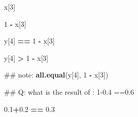 \documentclass[]{book}
\newenvironment{Shaded}{\begin{snugshade}}{\end{snugshade}}
\newcommand{\KeywordTok}[1]{\textcolor[rgb]{0.13,0.29,0.53}{\textbf{#1}}}
\newcommand{\DecValTok}[1]{\textcolor[rgb]{0.00,0.00,0.81}{#1}}
\newcommand{\FloatTok}[1]{\textcolor[rgb]{0.00,0.00,0.81}{#1}}
\newcommand{\StringTok}[1]{\textcolor[rgb]{0.31,0.60,0.02}{#1}}
\newcommand{\OperatorTok}[1]{\textcolor[rgb]{0.81,0.36,0.00}{\textbf{#1}}}
\newcommand{\NormalTok}[1]{#1}
\theoremstyle{definition}
\theoremstyle{definition}
\theoremstyle{definition}
\theoremstyle{remark}
\begin{document}
\begin{Shaded}
\begin{Highlighting}[]
\NormalTok{x[}\DecValTok{3}\NormalTok{]}
\end{Highlighting}
\end{Shaded}

\begin{Shaded}
\begin{Highlighting}[]
\DecValTok{1} \OperatorTok{-}\StringTok{ }\NormalTok{x[}\DecValTok{3}\NormalTok{]}
\end{Highlighting}
\end{Shaded}

\begin{Shaded}
\begin{Highlighting}[]
\NormalTok{y[}\DecValTok{4}\NormalTok{] }\OperatorTok{==}\StringTok{ }\DecValTok{1} \OperatorTok{-}\StringTok{ }\NormalTok{x[}\DecValTok{3}\NormalTok{]}
\end{Highlighting}
\end{Shaded}

\begin{Shaded}
\begin{Highlighting}[]
\NormalTok{y[}\DecValTok{4}\NormalTok{] }\OperatorTok{>}\StringTok{ }\DecValTok{1} \OperatorTok{-}\StringTok{ }\NormalTok{x[}\DecValTok{3}\NormalTok{]}
\end{Highlighting}
\end{Shaded}

\begin{Shaded}
\begin{Highlighting}[]
\NormalTok{## note:}
\KeywordTok{all.equal}\NormalTok{(y[}\DecValTok{4}\NormalTok{], }\DecValTok{1} \OperatorTok{-}\StringTok{ }\NormalTok{x[}\DecValTok{3}\NormalTok{])}
\end{Highlighting}
\end{Shaded}

\begin{Shaded}
\begin{Highlighting}[]
\NormalTok{## Q: what is the result of : 1-0.4 ==0.6}
\end{Highlighting}
\end{Shaded}

\begin{Shaded}
\begin{Highlighting}[]
\FloatTok{0.1}\OperatorTok{+}\FloatTok{0.2} \OperatorTok{==}\StringTok{ }\FloatTok{0.3}
\end{Highlighting}
\end{Shaded}
\end{document}
